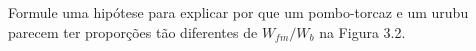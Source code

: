 Formule uma hipótese para explicar por que um pombo-torcaz e um urubu parecem ter proporções tão diferentes de $W_{fm} / W_b$ na Figura 3.2.


